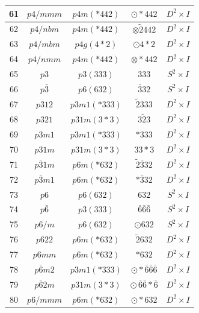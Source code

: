\documentclass[11pt]{article}
\begin{document}
\begin{table}[htbp]
{\begin{tabular}{|c|c|c|c|c|}
\hline
61 & $p4/mmm$ &$p4m (*442)$ & $\odot*442$ & $D^2 \times I$ \\
\hline
62 & $p4/nbm$ &$p4m (*442)$ & $\otimes\tilde{2}442$ & $D^2 \times I$ \\
\hline
63 & $p4/mbm$ &$p4g (4*2)$ & $\odot4*2$ & $D^2 \times I$ \\
\hline
64 & $p4/nmm$ &$p4m (*442)$ & $\otimes*442$ & $D^2 \times I$ \\
\hline
65 & $p3$ &$p3 (333)$ & $333$ & $S^2 \times I$ \\
\hline
66 & $p\bar{3}$ &$p6 (632)$ & $\bar{3}32$ & $S^2 \times I$ \\
\hline
67 & $p312$ &$p3m1 (*333)$ & $\tilde{2}333$ & $D^2 \times I$ \\
\hline
68 & $p321$ &$p31m (3*3)$ & $3\tilde{2}3$ & $D^2 \times I$ \\
\hline
69 & $p3m1$ &$p3m1 (*333)$ & $*333$ & $D^2 \times I$ \\
\hline
70 & $p31m$ &$p31m (3*3)$ & $33*3$ & $D^2 \times I$ \\
\hline
71 & $p\bar{3}1m$ &$p6m (*632)$ & $\tilde{2}\bar{3}32$ & $D^2 \times I$ \\
\hline
72 & $p\bar{3}m1$ &$p6m (*632)$ & $*\bar{3}32$ & $D^2 \times I$ \\
\hline
73 & $p6$ &$p6 (632)$ & $632$ & $S^2 \times I$ \\
\hline
74 & $p\bar{6}$ &$p3 (333)$ & $\bar{6}\bar{6}\bar{6}$ & $S^2 \times I$ \\
\hline
75 & $p6/m$ &$p6 (632)$ & $\odot632$ & $S^2 \times I$ \\
\hline
76 & $p622$  &$p6m (*632)$ & $\tilde{2}632$ & $D^2 \times I$ \\
\hline
77 & $p6mm$  &$p6m (*632)$ & $*632$ & $D^2 \times I$ \\
\hline
78 & $p\bar{6}m2$  &$p3m1 (*333)$ & $\odot*\bar{6}\bar{6}\bar{6}$ & $D^2 \times I$\\
\hline
79 & $p\bar{6}2m$  &$p31m (3*3)$ & $\odot \, \bar{6}\bar{6}*\bar{6}$ & $D^2 \times I$\\
\hline
80 & $p6/mmm$  &$p6m (*632)$ & $\odot *632$ & $D^2 \times I$ \\
\hline
\end{tabular}
}
\end{table}
\end{document}
